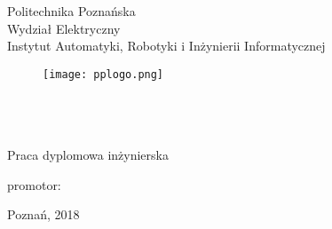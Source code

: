 \thispagestyle{empty}
\setcounter{page}{0}
\begin{center}
	\vspace{-10mm}
Politechnika Poznańska\\
Wydział Elektryczny\\  
Instytut Automatyki, Robotyki i Inżynierii Informatycznej\\
  \vspace{8mm}
\begin{figure}[ht!]
\centering
\texttt{[image: pplogo.png]}
\end{figure}
  \vspace{8mm}
\Large{\StudentA}\\
\Large{\StudentB}\\
  \vspace{10mm}
\LARGE{\TytulPolski}\\
  \vspace{10mm}
\Large{Praca dyplomowa inżynierska}\\
\end{center}
\vspace{40mm}
\begin{flushright}
{\large promotor:\\
\Promotor}
\end{flushright}

\vspace{15mm}
\begin{center}
Poznań, 2018
\end{center}
 
